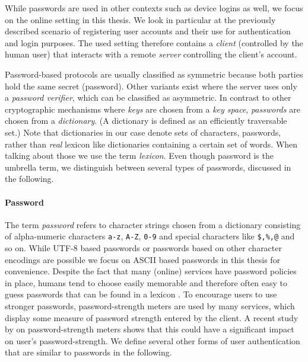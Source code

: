While passwords are used in other contexts such as device logins as well, we focus on the online setting in this thesis.
We look in particular at the previously described scenario of registering user accounts and their use for authentication and login purposes.
The used setting therefore contains a \emph{client} (controlled by the human user) that interacts with a remote \emph{server} controlling the client's account.

Password-based protocols are usually classified as symmetric because both parties hold the same secret (password).
Other variants exist where the server uses only a \emph{password verifier}, which can be classified as asymmetric.
In contrast to other cryptographic mechanisms where \emph{keys} are chosen from a \emph{key space}, \emph{passwords} are chosen from a \emph{dictionary}.
(A dictionary is defined as an efficiently traversable set.)
Note that dictionaries in our case denote sets of characters, \ie passwords, rather than \emph{real} lexicon like dictionaries containing a certain set of words.
When talking about those we use the term \emph{lexicon}.
Even though password is the umbrella term, we distinguish between several types of passwords, discussed in the following.

\paragraph{Password}
The term \emph{password} refers to character strings chosen from a dictionary consisting of alpha-numeric characters \texttt{a-z}, \texttt{A-Z}, \texttt{0-9} and special characters like \texttt{\$,\%,@} and so on.
While \acs{UTF-8} based passwords or passwords based on other character encodings are possible we focus on \acs{ASCII} based passwords in this thesis for convenience.
Despite the fact that many (online) services have password policies in place, humans tend to choose easily memorable and therefore often easy to guess passwords that can be found in a lexicon \cite{Florencio2007,Gaw2006}.
To encourage users to use stronger passwords, password-strength meters are used by many services, which display some measure of password strength entered by the client.
A recent study by \citet{Ur2012} on password-strength meters shows that this could have a significant impact on user's password-strength.
We define several other forms of user authentication that are similar to passwords in the following.

